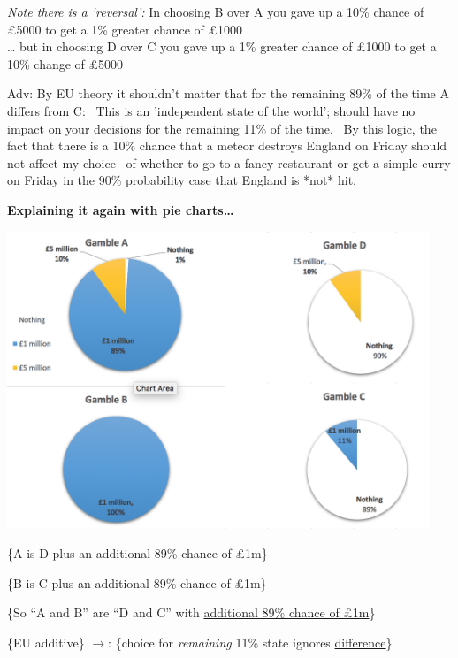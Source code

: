 \documentclass[]{article}
\begin{document}
\emph{Note there is a `reversal':}
In choosing B over A you gave up a 10\% chance of \pounds5000 to get a 1\% greater chance of \pounds1000\\
\ldots{} but in choosing D over C you gave up a 1\% greater chance of \pounds1000 to get a 10\% change of \pounds5000

\textcolor{RawSienna}{Adv: By EU theory it shouldn't matter that for the remaining 89\% of the time A differs from C: \
This is an 'independent state of the world'; should have no impact on your decisions for the remaining 11\% of the time. \
By this logic, the fact that there is a 10\% chance that a meteor destroys England on Friday should not affect my choice \
of whether to go to a fancy restaurant or get a simple curry on Friday in the 90\% probability case that England is *not* hit.}

\bigskip

\textbf{Explaining it again with pie charts\ldots{}}

\includegraphics[height=3.5in]{picsfigs/allaispies.png}

\medskip

\footnotesize\{A is D plus an additional 89\% chance of £1m\}

\bigskip

\footnotesize\{B is C plus an additional 89\% chance of £1m\}

\bigskip

\footnotesize\{So ``A and B'' are ``D and C'' with \underline{additional 89\% chance of \pounds 1m}\}

\bigskip

\footnotesize\{EU additive\} \(\rightarrow\): \footnotesize\{choice for \emph{remaining} 11\% state ignores \underline{difference}\}
\end{document}
